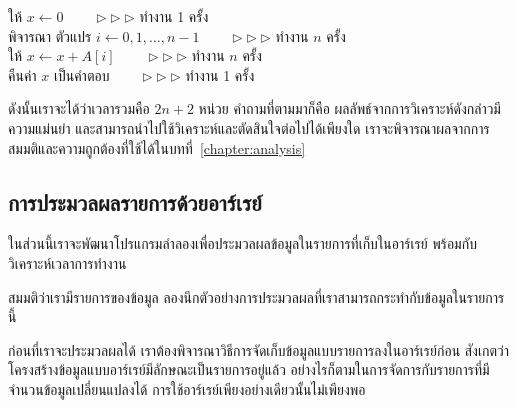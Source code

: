\begin{algt}
\noindent \hspace*{0.2in} ให้ $x\leftarrow 0$   \ \ \ \ $\rhd\rhd\rhd$ ทำงาน 1 ครั้ง\\
\hspace*{0.2in} พิจารณา ตัวแปร $i\leftarrow 0,1,\ldots,n-1$  \ \ \ \ $\rhd\rhd\rhd$ ทำงาน $n$ ครั้ง\\
\hspace*{0.2in}\hspace*{0.2in} ให้ $x \leftarrow x + A[i]$  \ \ \ \ $\rhd\rhd\rhd$ ทำงาน $n$ ครั้ง\\
\hspace*{0.2in} คืน{\wbr}ค่า $x$ เป็น{\wbr}คำตอบ  \ \ \ \ $\rhd\rhd\rhd$ ทำงาน 1 ครั้ง{\wbr}
\end{algt}

ดังนั้น{\wbr}เรา{\wbr}จะ{\wbr}ได้{\wbr}ว่า{\wbr}เวลา{\wbr}รวม{\wbr}คือ $2n + 2$ หน่วย คำถาม{\wbr}ที่{\wbr}ตาม{\wbr}มา{\wbr}ก็{\wbr}คือ{\wbr}
ผลลัพธ์{\wbr}จาก{\wbr}การ{\wbr}วิเคราะห์{\wbr}ดังกล่าว{\wbr}มี{\wbr}ความ{\wbr}แม่นยำ{\wbr}
และ{\wbr}สามารถ{\wbr}นำ{\wbr}ไป{\wbr}ใช้{\wbr}วิเคราะห์{\wbr}และ{\wbr}ตัดสินใจ{\wbr}ต่อไป{\wbr}ได้{\wbr}เพียงใด{\wbr}
เรา{\wbr}จะ{\wbr}พิจารณา{\wbr}ผล{\wbr}จาก{\wbr}การ{\wbr}สมมติ{\wbr}และ{\wbr}ความ{\wbr}ถูกต้อง{\wbr}ที่{\wbr}ใช้ได้{\wbr}ใน{\wbr}บท{\wbr}ที่~\ref{chapter:analysis}

\subsection{การ{\wbr}ประมวลผล{\wbr}รายการ{\wbr}ด้วย{\wbr}อาร์เรย์}
\label{sect:array-list-processing}

ใน{\wbr}ส่วน{\wbr}นี้{\wbr}เรา{\wbr}จะ{\wbr}พัฒนา{\wbr}โปรแกรม{\wbr}ลำ{\wbr}ลอง{\wbr}เพื่อ{\wbr}ประมวลผล{\wbr}ข้อมูล{\wbr}ใน{\wbr}รายการ{\wbr}ที่{\wbr}เก็บ{\wbr}ใน{\wbr}อาร์เรย์
พร้อมกับ{\wbr}วิเคราะห์{\wbr}เวลา{\wbr}การ{\wbr}ทำงาน{\wbr}

\begin{quiz}{}
สมมติ{\wbr}ว่า{\wbr}เรา{\wbr}มี{\wbr}รายการ{\wbr}ของ{\wbr}ข้อมูล ลอง{\wbr}นึก{\wbr}ตัวอย่าง{\wbr}การ{\wbr}ประมวลผล{\wbr}ที่{\wbr}เรา{\wbr}สามารถ{\wbr}กระทำ{\wbr}กับ{\wbr}ข้อมูล{\wbr}ใน{\wbr}รายการ{\wbr}นี้{\wbr}
\end{quiz}

ก่อน{\wbr}ที่{\wbr}เรา{\wbr}จะ{\wbr}ประมวลผล{\wbr}ได้ เรา{\wbr}ต้อง{\wbr}พิจารณา{\wbr}วิธีการ{\wbr}จัด{\wbr}เก็บ{\wbr}ข้อมูล{\wbr}แบบ{\wbr}รายการ{\wbr}ลง{\wbr}ใน{\wbr}อาร์เรย์{\wbr}ก่อน{\wbr}
สังเกต{\wbr}ว่า{\wbr}โครงสร้าง{\wbr}ข้อมูล{\wbr}แบบ{\wbr}อาร์เรย์{\wbr}มี{\wbr}ลักษณะ{\wbr}เป็น{\wbr}รายการ{\wbr}อยู่{\wbr}แล้ว{\wbr}
อย่างไรก็ตาม{\wbr}ใน{\wbr}การ{\wbr}จัดการ{\wbr}กับ{\wbr}รายการ{\wbr}ที่{\wbr}มี{\wbr}จำนวน{\wbr}ข้อมูล{\wbr}เปลี่ยนแปลง{\wbr}ได้{\wbr}
การ{\wbr}ใช้{\wbr}อาร์เรย์{\wbr}เพียง{\wbr}อย่างเดียว{\wbr}นั้น{\wbr}ไม่{\wbr}เพียงพอ{\wbr}

